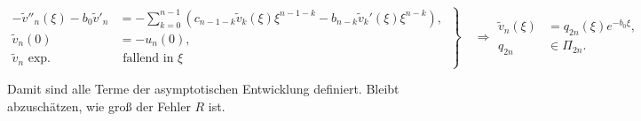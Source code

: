\begin{equation}\label{eq:vn}
  \left.
    \begin{aligned}
      -\tilde v''_{n}(\xi)-b_0\tilde v'_{n}
      &=-\sum\limits_{k=0}^{n-1}\left( c_{n-1-k}\tilde v_k(\xi)\xi^{n-1-k}-b_{n-k}\tilde v_k'(\xi)\xi^{n-k}\right) ,\\
      \tilde v_{n}(0)&=-u_{n}(0),\\
      \tilde v_{n} \mbox{ exp.}&\mbox{ fallend in $\xi$}
    \end{aligned}\,
  \right\}
  \quad\Rightarrow
  \begin{aligned}
    \tilde v_{n}(\xi) &= q_{2n}(\xi)e^{-b_0\xi},\\
    q_{2n}&\in\Pi_{2n}.
  \end{aligned}
\end{equation}

Damit sind alle Terme der asymptotischen Entwicklung definiert. Bleibt abzuschätzen, wie groß der Fehler $R$ ist.
